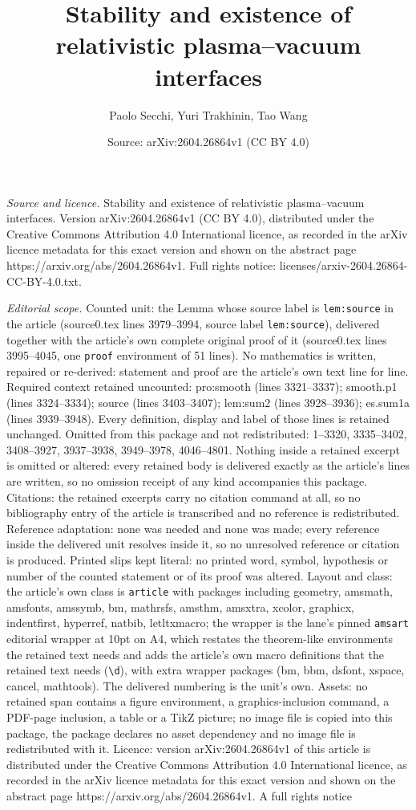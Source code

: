 \documentclass[10pt,a4paper]{amsart}
\title[Stability and existence of relativistic plasma--vacuum inter]{Stability and existence of relativistic plasma--vacuum interfaces}
\author{Paolo Secchi, Yuri Trakhinin, Tao Wang}
\date{Source: arXiv:2604.26864v1 (CC BY 4.0)}
\begin{document}
\maketitle

\noindent\emph{Source and licence.} Stability and existence of relativistic plasma--vacuum interfaces. Version arXiv:2604.26864v1 (CC BY 4.0), distributed under the Creative Commons Attribution 4.0 International licence, as recorded in the arXiv licence metadata for this exact version and shown on the abstract page https://arxiv.org/abs/2604.26864v1. Full rights notice: licenses/arxiv-2604.26864-CC-BY-4.0.txt.\par\smallskip

\noindent\textit{Editorial scope.} Counted unit: the Lemma whose source label is \texttt{lem:source} in the article (source0.tex lines 3979--3994, source label \texttt{lem:source}), delivered together with the article's own complete original proof of it (source0.tex lines 3995--4045, one \texttt{proof} environment of 51 lines). No mathematics is written, repaired or re-derived: statement and proof are the article's own text line for line. Required context retained uncounted: pro:smooth (lines 3321--3337); smooth.p1 (lines 3324--3334); source (lines 3403--3407); lem:sum2 (lines 3928--3936); es.sum1a (lines 3939--3948). Every definition, display and label of those lines is retained unchanged. Omitted from this package and not redistributed: 1--3320, 3335--3402, 3408--3927, 3937--3938, 3949--3978, 4046--4801. Nothing inside a retained excerpt is omitted or altered: every retained body is delivered exactly as the article's lines are written, so no omission receipt of any kind accompanies this package. Citations: the retained excerpts carry no citation command at all, so no bibliography entry of the article is transcribed and no reference is redistributed. Reference adaptation: none was needed and none was made; every reference inside the delivered unit resolves inside it, so no unresolved reference or citation is produced. Printed slips kept literal: no printed word, symbol, hypothesis or number of the counted statement or of its proof was altered. Layout and class: the article's own class is \texttt{article} with packages including geometry, amsmath, amsfonts, amssymb, bm, mathrsfs, amsthm, amsxtra, xcolor, graphicx, indentfirst, hyperref, natbib, letltxmacro; the wrapper is the lane's pinned \texttt{amsart} editorial wrapper at 10pt on A4, which restates the theorem-like environments the retained text needs and adds the article's own macro definitions that the retained text needs (\texttt{\textbackslash d}), with extra wrapper packages (bm, bbm, dsfont, xspace, cancel, mathtools). The delivered numbering is the unit's own. Assets: no retained span contains a figure environment, a graphics-inclusion command, a PDF-page inclusion, a table or a TikZ picture; no image file is copied into this package, the package declares no asset dependency and no image file is redistributed with it. Licence: version arXiv:2604.26864v1 of this article is distributed under the Creative Commons Attribution 4.0 International licence, as recorded in the arXiv licence metadata for this exact version and shown on the abstract page https://arxiv.org/abs/2604.26864v1. A full rights notice 
\end{document}
